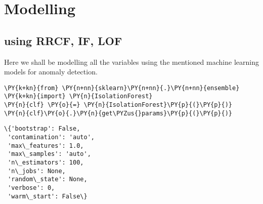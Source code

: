     \hypertarget{modelling}{%
\section{Modelling}\label{modelling}}

\hypertarget{using-rrcf-if-lof}{%
\subsection{using RRCF, IF, LOF}\label{using-rrcf-if-lof}}

    Here we shall be modelling all the variables using the mentioned machine
learning models for anomaly detection.

    \begin{tcolorbox}[breakable, size=fbox, boxrule=1pt, pad at break*=1mm,colback=cellbackground, colframe=cellborder]
\begin{Verbatim}[commandchars=\\\{\}]
\PY{k+kn}{from} \PY{n+nn}{sklearn}\PY{n+nn}{.}\PY{n+nn}{ensemble} \PY{k+kn}{import} \PY{n}{IsolationForest}
\PY{n}{clf} \PY{o}{=} \PY{n}{IsolationForest}\PY{p}{(}\PY{p}{)}
\PY{n}{clf}\PY{o}{.}\PY{n}{get\PYZus{}params}\PY{p}{(}\PY{p}{)}
\end{Verbatim}
\end{tcolorbox}

            \begin{tcolorbox}[breakable, size=fbox, boxrule=.5pt, pad at break*=1mm, opacityfill=0]
\begin{Verbatim}[commandchars=\\\{\}]
\{'bootstrap': False,
 'contamination': 'auto',
 'max\_features': 1.0,
 'max\_samples': 'auto',
 'n\_estimators': 100,
 'n\_jobs': None,
 'random\_state': None,
 'verbose': 0,
 'warm\_start': False\}
\end{Verbatim}
\end{tcolorbox}
        
